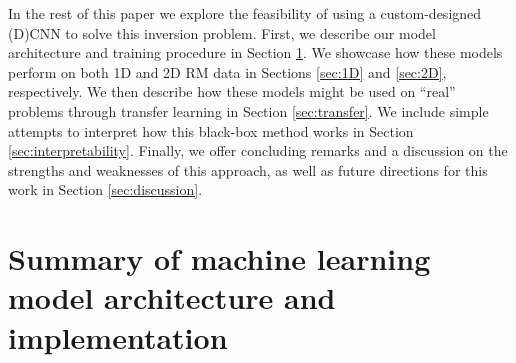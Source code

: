 \documentclass[floatfix,twocolumn,trackchanges,linenumbers]{aastex7}
\begin{document}
In the rest of this paper we explore the feasibility of using a custom-designed (D)CNN to solve this inversion problem. First, we describe our model architecture and training procedure in Section \ref{sec:models}. We showcase how these models perform on both 1D and 2D RM data in Sections \ref{sec:1D} and \ref{sec:2D}, respectively. We then describe how these models might be used on ``real'' problems through transfer learning in Section \ref{sec:transfer}. We include simple attempts to interpret how this black-box method works in Section \ref{sec:interpretability}. Finally, we offer concluding remarks and a discussion on the strengths and weaknesses of this approach, as well as future directions for this work in Section \ref{sec:discussion}.

\section{Summary of machine learning model architecture and implementation}
\label{sec:models}
\end{document}

